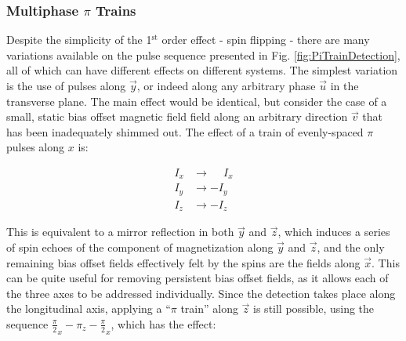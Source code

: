 \documentclass[PaulGanssle-Thesis.tex]{subfiles}
\begin{document}
\subsubsection{Multiphase $\pi$ Trains}
\label{nmr.signal.magnetization.pitrain.variations}
Despite the simplicity of the 1$^{\textrm{st}}$ order effect - spin flipping - there are many variations available on the pulse sequence presented in Fig. \ref{fig:PiTrainDetection}, all of which can have different effects on different systems. The simplest variation is the use of pulses along $\vec{y}$, or indeed along any arbitrary phase $\vec{u}$ in the transverse plane. The main effect would be identical, but consider the case of a small, static bias offset magnetic field field along an arbitrary direction $\vec{v}$ that has been inadequately shimmed out. The effect of a train of evenly-spaced $\pi$ pulses along $x$ is:

\begin{align}
\label{eqn:PiXPulseEffect}
I_{x} & \rightarrow \phantom{-}I_{x} \nonumber\\
I_{y} & \rightarrow -I_{y}  \\
I_{z} & \rightarrow -I_{z} \nonumber
\end{align}

This is equivalent to a mirror reflection in both $\vec{y}$ and $\vec{z}$, which induces a series of spin echoes of the component of magnetization along $\vec{y}$ and $\vec{z}$, and the only remaining bias offset fields effectively felt by the spins are the fields along $\vec{x}$. This can be quite useful for removing persistent bias offset fields, as it allows each of the three axes to be addressed individually. Since the detection takes place along the longitudinal axis, applying a ``$\pi$ train'' along $\vec{z}$ is still possible, using the sequence $\frac{\pi}{2}_{x}-\pi_{z}-\frac{\pi}{2}_{x}$, which has the effect:
\end{document}
